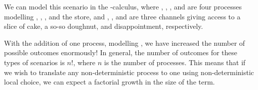 \documentclass[envcountsame,UKenglish]{llncs}
\begin{document}
We can model this scenario in the \textpi-calculus, where \ami, \boe, \cat, and \store are four processes modelling \Ami, \Boe, \Cat, and the store, and \sliceofcake, \doughnut, and \nope are three channels giving access to a slice of cake, a so-so doughnut, and disappointment, respectively.
\begin{center}
\end{center}
With the addition of one process, modelling \Cat, we have increased the number of possible outcomes enormously! In general, the number of outcomes for these types of scenarios is $n!$, where $n$ is the number of processes. This means that if we wish to translate any non-deterministic process to one using non-deterministic local choice, we can expect a factorial growth in the size of the term.
\end{document}
